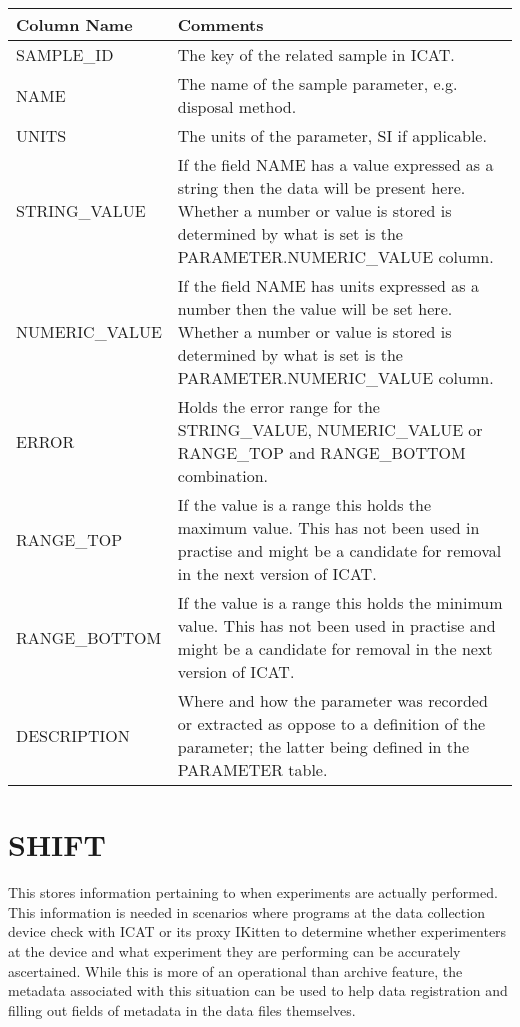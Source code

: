 \documentclass{report}
\begin{document}
\begin{tabular}{|l|l|}
\hline
Column Name & Comments \\ \hline
SAMPLE\_ID & \multicolumn{1}{p{100mm}|}{
The key of the related sample in ICAT.} \\ \hline
NAME & \multicolumn{1}{p{100mm}|}{
The name of the sample parameter, e.g. disposal method.} \\ \hline
UNITS & \multicolumn{1}{p{100mm}|}{
The units of the parameter, SI if applicable.} \\ \hline
STRING\_VALUE & \multicolumn{1}{p{100mm}|}{
If the field NAME has a value expressed as a string then the data will be present here. Whether a number or value is stored is determined by what is set is the PARAMETER.NUMERIC\_VALUE column.} \\ \hline
NUMERIC\_VALUE & \multicolumn{1}{p{100mm}|}{
If the field NAME has units expressed as a number then the value will be set here. Whether a number or value is stored is determined by what is set is the PARAMETER.NUMERIC\_VALUE column.} \\ \hline
ERROR & \multicolumn{1}{p{100mm}|}{
Holds the error range for the STRING\_VALUE, NUMERIC\_VALUE or RANGE\_TOP and RANGE\_BOTTOM combination.} \\ \hline
RANGE\_TOP & \multicolumn{1}{p{100mm}|}{
If the value is a range this holds the maximum value. This has not been used in practise and might be a candidate for removal in the next version of ICAT.} \\ \hline
RANGE\_BOTTOM & \multicolumn{1}{p{100mm}|}{
If the value is a range this holds the minimum value. This has not been used in practise and might be a candidate for removal in the next version of ICAT.} \\ \hline
DESCRIPTION & \multicolumn{1}{p{100mm}|}{
Where and how the parameter was recorded or extracted as oppose to a definition of the parameter; the latter being defined in the PARAMETER table.} \\ \hline
\end{tabular}
\section{SHIFT}

This stores information pertaining to when experiments are actually performed. This information is needed in scenarios where programs at the data collection device check with ICAT or its proxy IKitten to determine whether experimenters at the device and what experiment they are performing can be accurately ascertained. While this is more of an operational than archive feature, the metadata associated with this situation can be used to help data registration and filling out fields of metadata in the data files themselves.\\
\end{document}
